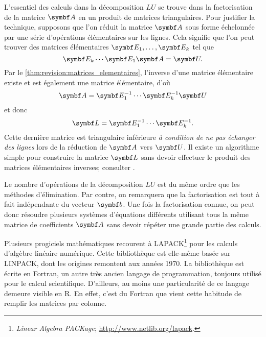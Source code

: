 L'essentiel des calculs dans la décomposition $LU$ se trouve dans la
factorisation de la matrice $\mat{A}$ en un produit de matrices
triangulaires. Pour justifier la technique, supposons que l'on réduit
la matrice $\mat{A}$ sous forme échelonnée par une série d'opérations
élémentaires sur les lignes. Cela signifie que l'on peut trouver des matrices
élémentaires $\mat{E}_1, \dots, \mat{E}_k$ tel que
\begin{displaymath}
  \mat{E}_k \cdots \mat{E}_1 \mat{A} = \mat{U}.
\end{displaymath}
Par le \autoref{thm:revision:matrices_elementaires}, l'inverse
d'une matrice élémentaire existe et est également une matrice
élémentaire, d'où
\begin{displaymath}
  \mat{A} = \mat{E}_1^{-1} \cdots \mat{E}_k^{-1} \mat{U}
\end{displaymath}
et donc
\begin{displaymath}
  \mat{L} = \mat{E}_1^{-1} \cdots \mat{E}_k^{-1}.
\end{displaymath}
Cette dernière matrice est triangulaire inférieure \emph{à condition
  de ne pas échanger des lignes} lors de la réduction de $\mat{A}$
vers $\mat{U}$.  Il existe un algorithme simple pour construire la
matrice $\mat{L}$ sans devoir effectuer le produit des matrices
élémentaires inverses; consulter \citet[section 9.9]{Anton:linear:8e:2000}.

Le nombre d'opérations de la décomposition $LU$ est du même ordre que
les méthodes d'élimination. Par contre, on remarquera que la
factorisation est tout à fait indépendante du vecteur $\mat{b}$. Une
fois la factorisation connue, on peut donc résoudre plusieurs systèmes
d'équations différents utilisant tous la même matrice de coefficients
$\mat{A}$ sans devoir répéter une grande partie des calculs.

\begin{rem}
  Plusieurs progiciels mathématiques recourent à  LAPACK\footnote{%
    \emph{Linear Algebra PACKage};
    \url{http://www.netlib.org/lapack}.} %
  pour les calculs d'algèbre linéaire numérique. Cette bibliothèque
  est elle-même basée sur LINPACK, dont les origines remontent aux
  années 1970. La bibliothèque est écrite en Fortran, un autre très
  ancien langage de programmation, toujours utilisé pour le calcul
  scientifique. D'ailleurs, au moins une particularité de ce langage
  demeure visible en R. En effet, c'est du Fortran que vient cette
  habitude de remplir les matrices par colonne.
\end{rem}


